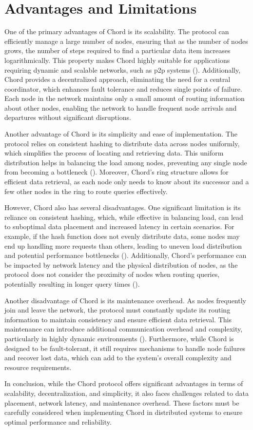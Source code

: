 \section{Advantages and Limitations}
One of the primary advantages of Chord is its scalability.
The protocol can efficiently manage a large number of nodes, ensuring that as the number of nodes grows, the number of steps required to find a particular data item increases logarithmically.
This property makes Chord highly suitable for applications requiring dynamic and scalable networks, such as \gls{p2p} systems (\cite{stoica2001}).
Additionally, Chord provides a decentralized approach, eliminating the need for a central coordinator, which enhances fault tolerance and reduces single points of failure.
Each node in the network maintains only a small amount of routing information about other nodes, enabling the network to handle frequent node arrivals and departures without significant disruptions.

Another advantage of Chord is its simplicity and ease of implementation.
The protocol relies on consistent hashing to distribute data across nodes uniformly, which simplifies the process of locating and retrieving data.
This uniform distribution helps in balancing the load among nodes, preventing any single node from becoming a bottleneck (\cite{stoica2001}).
Moreover, Chord's ring structure allows for efficient data retrieval, as each node only needs to know about its successor and a few other nodes in the ring to route queries effectively.

However, Chord also has several disadvantages.
One significant limitation is its reliance on consistent hashing, which, while effective in balancing load, can lead to suboptimal data placement and increased latency in certain scenarios.
For example, if the hash function does not evenly distribute data, some nodes may end up handling more requests than others, leading to uneven load distribution and potential performance bottlenecks (\cite{stoica2001}).
Additionally, Chord's performance can be impacted by network latency and the physical distribution of nodes, as the protocol does not consider the proximity of nodes when routing queries, potentially resulting in longer query times (\cite{balatsouras2022wichord}).

Another disadvantage of Chord is its maintenance overhead.
As nodes frequently join and leave the network, the protocol must constantly update its routing information to maintain consistency and ensure efficient data retrieval.
This maintenance can introduce additional communication overhead and complexity, particularly in highly dynamic environments (\cite{stoica2001}).
Furthermore, while Chord is designed to be fault-tolerant, it still requires mechanisms to handle node failures and recover lost data, which can add to the system's overall complexity and resource requirements.

In conclusion, while the Chord protocol offers significant advantages in terms of scalability, decentralization, and simplicity, it also faces challenges related to data placement, network latency, and maintenance overhead.
These factors must be carefully considered when implementing Chord in distributed systems to ensure optimal performance and reliability.